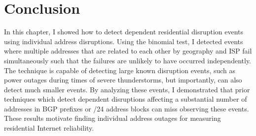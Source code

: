 
\section{Conclusion}

In this chapter, I showed how to detect dependent residential disruption events using individual address disruptions. Using the binomial test, I detected events where multiple addresses that are related to each other by geography and ISP fail simultaneously such that the failures are unlikely to have occurred independently. The technique is capable of detecting large known
disruption events, such as power outages during times of severe
thunderstorms, but importantly, can also detect much smaller
events. By analyzing these events, I demonstrated that prior techniques which detect dependent disruptions affecting a substantial number of addresses in BGP prefixes or /24 address blocks can miss observing these events. These results motivate finding individual address outages for measuring residential Internet reliability.